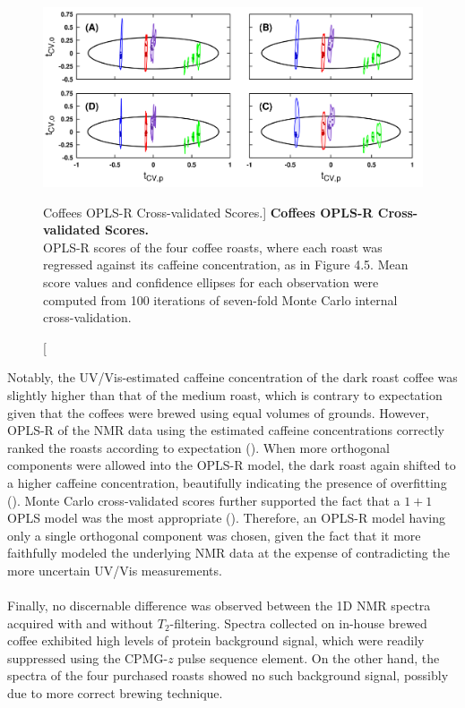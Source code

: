 \begin{figure}[H]
\includegraphics[width=6in]{figs/apps/06-oplsr-tcv.png}
\caption
      [Coffees OPLS-R Cross-validated Scores.]{
  {\bf Coffees OPLS-R Cross-validated Scores.}
  \\
  OPLS-R scores of the four coffee roasts, where each roast was regressed
  against its caffeine concentration, as in Figure 4.5. Mean score values
  and confidence ellipses for each observation were computed from 100
  iterations of seven-fold Monte Carlo internal cross-validation.
}
\label{figure.4.6}
\end{figure}

\begin{doublespace}
Notably, the UV/Vis-estimated caffeine concentration of the dark roast coffee
was slightly higher than that of the medium roast, which is contrary to
expectation given that the coffees were brewed using equal volumes of
grounds. However, OPLS-R of the NMR data using the estimated caffeine
concentrations correctly ranked the roasts according to expectation
(). When more orthogonal components were allowed
into the OPLS-R model, the dark roast again shifted to a higher caffeine
concentration, beautifully indicating the presence of overfitting
(). Monte Carlo cross-validated scores further
supported the fact that a $1+1$ OPLS model was the most appropriate
(). Therefore, an OPLS-R model having only a single
orthogonal component was chosen, given the fact that it more faithfully
modeled the underlying NMR data at the expense of contradicting the more
uncertain UV/Vis measurements.
\\\\
Finally, no discernable difference was observed between the 1D \hnmr{} NMR
spectra acquired with and without $T_2$-filtering. Spectra collected on
in-house brewed coffee exhibited high levels of protein background signal,
which were readily suppressed using the CPMG-$z$ pulse sequence element. On
the other hand, the spectra of the four purchased roasts showed no such
background signal, possibly due to more correct brewing technique.
\end{doublespace}

